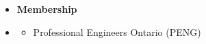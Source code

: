 \begin {itemize} \item [] {\bf \Large    Membership }  \vspace{-1.5em}
\item []  {\bf \hrulefill } \mdseries \normalsize 
    \begin {itemize}
        \item [$\bullet$]  {\normalsize Professional Engineers Ontario (PENG)}
    \end {itemize}
\end {itemize}

